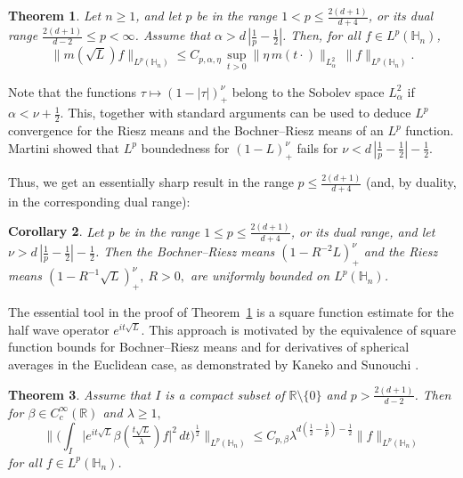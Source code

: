 \documentclass[leqno]{amsart}
\newtheorem{theorem}{Theorem}[section]
\newtheorem{corollary}[theorem]{Corollary}
\theoremstyle{definition}
\theoremstyle{remark}
\numberwithin{equation}{section}
\newcommand\la{{\lambda}}
\newcommand\bbH{{\mathbb {H}}}
\newcommand\bbR{{\mathbb {R}}}
\begin{document}
\begin{theorem}\label{thm:Lp-mult}
Let $n\ge 1$, and let $p$ be in the range $1<p\le \frac{2(d+1)}{d+4}$, or its dual range $\frac{2(d+1)}{d-2}\le p<\infty$. Assume that $\alpha>d\,|\frac 1p-\frac12|$. 
Then, for all $f\in L^p(\bbH_n)$,
\[
\|m(\sqrt{L})f\|_{L^p(\bbH_n)}
 \le C_{p,\alpha,\eta}\,  \sup_{t>0} \|\eta \, m(t\cdot) \|_{L^2_\alpha} \, \|f\|_{L^p(\bbH_n)} .
\]   
\end{theorem}

Note that the functions $\tau\mapsto(1-|\tau|)_+^\nu$  belong to the Sobolev space $L^2_\alpha$ if $\alpha <\nu+\frac 12$.  
This, together with standard arguments can be used to deduce $L^p$ convergence for the Riesz means  
and the Bochner--Riesz means of an $L^p$ function. Martini \cite{Martini25} showed that $L^p$ boundedness for $(1-L)_+^\nu$ fails for $\nu<d\,|\frac 1p-\frac 12|-\frac 12$.

Thus, we get an essentially sharp result in the range $p\le \frac{2(d+1)}{d+4}$ (and, by duality, in the corresponding dual range):

\begin{corollary} \label{BR-cor}
Let $p$ be in the range $1\le p\le \frac{2(d+1)}{d+4}$, or its dual range, and let $\nu>d\,|\frac 1p-\frac 12|-\frac 12$.
Then the Bochner--Riesz means $(1-R^{-2} L)_+^\nu$ and the Riesz means $(1-R^{-1} \sqrt L)_+^\nu, \ R>0,$ are uniformly bounded on $L^p(\bbH_n)$.
\end{corollary} 
 
The  essential tool in the proof of Theorem~\ref{thm:Lp-mult} is a square function estimate for the half wave operator $e^{it\sqrt L} $. This approach is motivated by the equivalence of square function bounds for Bochner--Riesz means and for derivatives of spherical averages in the Euclidean case,  as demonstrated by Kaneko and Sunouchi \cite{KanekoSunouchi}.

\begin{theorem}\label{thm:main-square}
Assume that $I$ is a compact subset of $\bbR\setminus \{0\}$ and $p> \frac{2(d+1)}{d-2}$.
Then for  $\beta\in C^\infty_c(\bbR)$ and $\la\ge 1,$
\begin{equation}\label{eq:main-square}
\Big\| \Big( \int_I \big| e^{i t\sqrt{L}} \beta(\tfrac{t\sqrt{L}}{\la}) f \big|^2 \, dt \Big)^{\frac 12} \Big\|_{L^p(\bbH_n)} \le C_{p,\beta}  \la^{d(\frac 12-\frac 1p)-\frac 12} \|f\|_{L^p(\bbH_n)}
\end{equation}
for all $f\in L^p(\bbH_n)$. 
\end{theorem}
\end{document}
